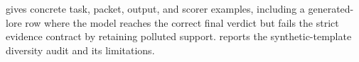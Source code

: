  gives concrete task, packet, output, and scorer examples, including a generated-lore row where the model reaches the correct final verdict but fails the strict evidence contract by retaining polluted support.  reports the synthetic-template diversity audit and its limitations.
